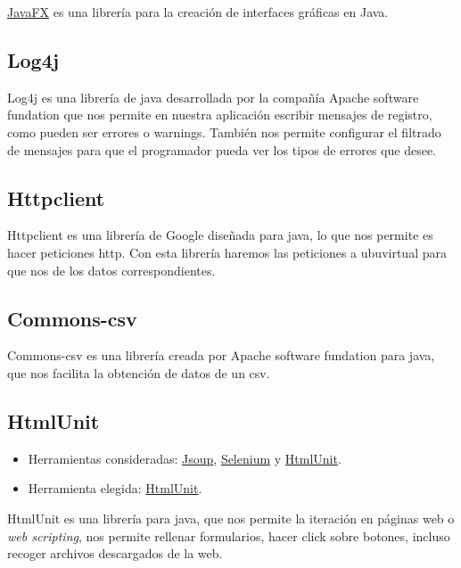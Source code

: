 \href{http://docs.oracle.com/javase/8/javase-clienttechnologies.htm}{JavaFX}
es una librería para la creación de interfaces gráficas en Java.

\subsection{Log4j}\label{log4j}

Log4j es una librería de java desarrollada por la compañía Apache software fundation que nos permite en nuestra aplicación escribir mensajes de registro, como pueden ser errores o warnings. También nos permite configurar el filtrado de mensajes para que el programador pueda ver los tipos de errores que desee. \cite{Java:log}

\subsection{Httpclient}\label{httpclient}

Httpclient es una librería de Google diseñada para java, lo que nos permite es hacer peticiones http. Con esta librería haremos las peticiones a ubuvirtual para que nos de los datos correspondientes. \cite{java:Httpclient}

\subsection{Commons-csv}\label{commons-csv}

Commons-csv es una librería creada por Apache software fundation para java, que nos facilita la obtención de datos de un csv. \cite{java:csvparser}

\subsection{HtmlUnit}\label{htmlunit}
\begin{itemize}
	\tightlist
	\item
	Herramientas consideradas: \href{https://jsoup.org/}{Jsoup},
	\href{http://www.seleniumhq.org/}{Selenium} y
	\href{http://htmlunit.sourceforge.net/}{HtmlUnit}.
	\item
	Herramienta elegida: \href{http://htmlunit.sourceforge.net/}{HtmlUnit}.
\end{itemize}

HtmlUnit es una librería para java, que nos permite la iteración en páginas web o \emph{web scripting}, nos permite rellenar formularios, hacer click sobre botones, incluso recoger archivos descargados de la web. \cite{Java:htmlunit}


